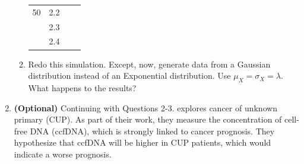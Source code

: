 \documentclass{article}\usepackage[]{graphicx}\usepackage[]{xcolor}
\begin{document}
\begin{enumerate}
\begin{enumerate}
\begin{table}[H]
\begin{tabular}{llcc}
50      &    2.2         &                              &            \\
        &    2.3         &                              &            \\
        &    2.4         &                              &            \\\hline
      \end{tabular}
    \end{table}
    \item Redo this simulation. Except, now, generate data from a Gaussian 
    distribution instead of an Exponential distribution. Use $\mu_X=\sigma_X=\lambda$.
    What happens to the results?
  \end{enumerate}
  \item \textbf{(Optional)} Continuing with Questions 2-3. \cite{Pouyiourou23} 
  explores cancer of unknown primary (CUP). As part of their work, they measure 
  the concentration of cell-free DNA (ccfDNA), which is strongly linked to 
  cancer prognosis. They hypothesize that ccfDNA will be higher in CUP patients, 
  which would indicate a worse prognosis.
  

\end{enumerate}
\end{document}
